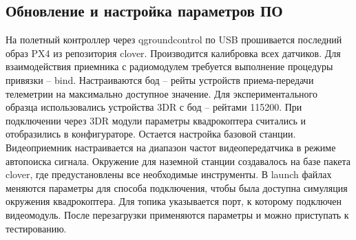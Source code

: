 \subsection{Обновление и настройка параметров ПО}
На полетный контроллер через qgroundcontrol по USB прошивается последний образ PX4 из репозитория clover. Производится калибровка всех датчиков. Для взаимодействия приемника с радиомодулем требуется выполнение процедуры привязки -- bind.
Настраиваются бод -- рейты устройств приема-передачи телеметрии на максимально доступное значение. Для экспериментального образца использовались устройства 3DR с бод -- рейтами 115200. При подключении через 3DR модули параметры квадрокоптера считались и отобразились в конфигураторе. Остается настройка базовой станции. Видеоприемник настраивается на диапазон частот видеопередатчика в режиме автопоиска сигнала. Окружение для наземной станции создавалось на базе пакета clover, где предустановлены все необходимые инструменты. В launch файлах меняются параметры для способа подключения, чтобы была доступна симуляция окружения квадрокоптера. Для топика указывается порт, к которому подключен видеомодуль. После перезагрузки применяются параметры и можно приступать к тестированию.
